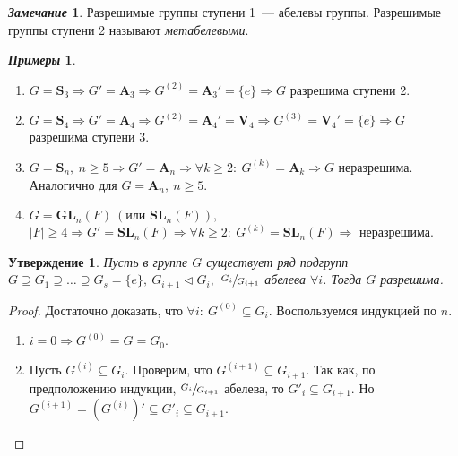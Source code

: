 \documentclass[a4paper, 14pt]{extarticle}
\newcommand{\GL}{\mathbf{GL}}
\newcommand{\SL}{\mathbf{SL}}
\newcommand{\quaternary}{\mathbf{V}_4}
\newcommand{\symmetrical}{\mathbf{S}}
\newcommand{\alternating}{\mathbf{A}}
\newcommand{\suchthat}{{:}{ } \ }
\theoremstyle{definition}
\newtheorem*{exmpls}{\textit{Примеры}}
\newtheorem*{remark}{\textit{Замечание}}
\theoremstyle{plain}
\numberwithin{theorem}{section}
\numberwithin{definition}{section}
\newtheorem{statement}{Утверждение}
\numberwithin{statement}{section}
\numberwithin{lemma}{section}
\numberwithin{consequence}{section}
\begin{document}
        \begin{remark}
            Разрешимые группы ступени 1~--- абелевы группы. Разрешимые группы ступени 2 называют \textit{метабелевыми}.
        \end{remark}
        \begin{exmpls}
        \
            \begin{enumerate}
            \setlength\itemsep{0.1em}
                \item ${G = \symmetrical_3 \Rightarrow G' = \alternating_3 \Rightarrow G^{(2)} = \alternating_3' = \{e\} \Rightarrow G}$ разрешима ступени 2. 
                \item ${G = \symmetrical_4 \Rightarrow G' = \alternating_4 \Rightarrow G^{(2)} = \alternating_4' = \quaternary \Rightarrow G^{(3)} = \quaternary' = \{e\} \Rightarrow G}$ разрешима ступени 3. 
                \item ${G = \symmetrical_n, \ n \geqslant 5 \Rightarrow G' = \alternating_n \Rightarrow \forall k \geqslant 2\suchthat G^{(k)} = \alternating_k \Rightarrow G}$ неразрешима. Аналогично для ${G = \alternating_n, \ n \geqslant 5.}$ 
                \item ${G = \GL_n(F) \ (\textrm{или }\SL_n(F)),}$ ${|F| \geqslant 4 \Rightarrow G' = \SL_n(F) \Rightarrow \forall k \geqslant 2\suchthat G^{(k)} = \SL_n(F) \Rightarrow}$ неразрешима. 
            \end{enumerate}
        \end{exmpls}
        \newpage
        \begin{statement}
            Пусть в группе $G$ существует ряд подгрупп ${G \supseteq G_1 \supseteq \ldots \supseteq G_s = \{e\}, \ G_{i+1} \lhd G_i,}$ ${\sfrac{G_i}{G_{i+1}}}$ абелева $\forall i$. Тогда $G$ разрешима.
        \end{statement}
        \begin{proof}
            Достаточно доказать, что ${\forall i\suchthat G^{(0)} \subseteq G_i.}$ Воспользуемся индукцией по $n$.
            \begin{enumerate}
            \setlength\itemsep{0.1em}
                \item ${i = 0 \Rightarrow G^{(0)} = G = G_0.}$
                \item Пусть ${G^{(i)} \subseteq G_i.}$ Проверим, что ${G^{(i + 1)} \subseteq G_{i+1}.}$ Так как, по предположению индукции, ${\sfrac{G_i}{G_{i+1}}}$ абелева, то ${G'_i \subseteq G_{i+1}.}$ Но ${G^{(i+1)} = (G^{(i)})' \subseteq G'_i \subseteq G_{i+1}.}$ \qedhere
            \end{enumerate}
        \end{proof}
\end{document}

